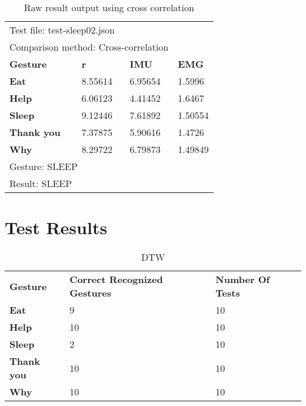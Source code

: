 \begin{table}[H]
\centering
    \begin{tabular}{  l  p{3cm}  p{3cm} p{3cm}}
        \multicolumn{3}{l}{Test file: test-sleep02.json} \\
        \multicolumn{3}{l}{Comparison method: Cross-correlation} \\[0.3cm]
        \hline
        \textbf{Gesture} & \textbf{r} & \textbf{IMU} & \textbf{EMG} \\ \Xhline{4\arrayrulewidth}
        
        \textbf{Eat} & 8.55614 &  6.95654 & 1.5996 \\ 
        
        \textbf{Help}  & 6.06123 &  4.41452 & 1.6467 \\ 
        
        \textbf{Sleep}  & 9.12446 &  7.61892 & 1.50554 \\ 
        
        \textbf{Thank you} & 7.37875 &  5.90616 & 1.4726 \\ 
        
        \textbf{Why} & 8.29722 & 6.79873 & 1.49849 \\ 
        \hline
        
        \multicolumn{3}{l}{Gesture: SLEEP} \\
        \multicolumn{3}{l}{Result: SLEEP}\\
    \end{tabular}
    \caption[Raw Result of Cross correlation]{Raw result output using cross correlation}
    \label{table:raw_result_test-sleep02_cross_correlation}
\end{table}

\section{Test Results}
\label{sec:test_results}

\begin{table}[ht!]
\centering
    \begin{tabular}{ | l | p{4cm} | p{4cm}|}
        \hline
        \textbf{Gesture} & \textbf{Correct Recognized Gestures} & \textbf{Number Of Tests} \\ \Xhline{4\arrayrulewidth}
        
        \textbf{Eat} & 9 &  10 \\ \hline
        
        \textbf{Help}  & 10 &  10 \\ \hline
        
        \textbf{Sleep}  & 2 &  10 \\ \hline
        
        \textbf{Thank you}  & 10 &  10 \\ \hline
        
        \textbf{Why}  & 10 &  10 \\ \hline
    \end{tabular}
    \caption[DTW test]{DTW}
    \label{table:DTW_test}
\end{table}

